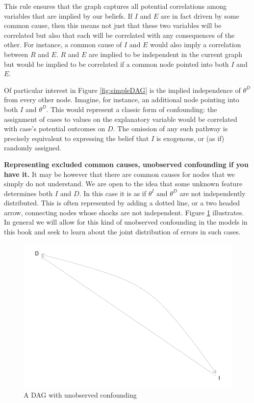 \documentclass[
  12pt,
]{book}
\begin{document}
This rule ensures that the graph captures all potential correlations among variables that are implied by our beliefs. If \(I\) and \(E\) are in fact driven by some common cause, then this means not just that these two variables will be correlated but also that each will be correlated with any consequences of the other. For instance, a common cause of \(I\) and \(E\) would also imply a correlation between \(R\) and \(E\). \(R\) and \(E\) are implied to be independent in the current graph but would be implied to be correlated if a common node pointed into both \(I\) and \(E\).

Of particular interest in Figure \ref{fig:simpleDAG} is the implied independence of \(\theta^D\) from every other node. Imagine, for instance, an additional node pointing into both \(I\) and \(\theta^D\). This would represent a classic form of confounding: the assignment of cases to values on the explanatory variable would be correlated with case's potential outcomes on \(D\). The omission of any such pathway is precisely equivalent to expressing the belief that \(I\) is exogenous, or (as if) randomly assigned.

\textbf{Representing excluded common causes, unobserved confounding if you have it.} It may be however that there are common causes for nodes that we simply do not understand. We are open to the idea that some unknown feature determines both \(I\) and \(D\). In this case it is as if \(\theta^I\) and \(\theta^D\) are not independently distributed. This is often represented by adding a dotted line, or a two headed arrow, connecting nodes whose shocks are not independent. Figure \ref{fig:simpleDAGb} illustrates. In general we will allow for this kind of unobserved confounding in the models in this book and seek to learn about the joint distribution of errors in such cases.

\begin{figure}
\centering
\includegraphics{ii_files/figure-latex/simpleDAGb-1.pdf}
\caption{\label{fig:simpleDAGb}A DAG with unobserved confounding}
\end{figure}
\end{document}
